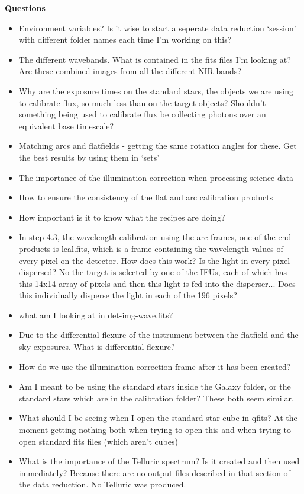 \documentclass{literature}
\begin{document}
\textbf{Questions}
\begin{itemize}
\item Environment variables? Is it wise to start a seperate data reduction `session' with different folder names each time I'm working on this? 
\item The different wavebands. What is contained in the fits files I'm looking at? Are these combined images from all the different NIR bands? 
\item Why are the exposure times on the standard stars, the objects we are using to calibrate flux, so much less than on the target objects? Shouldn't something being used to calibrate flux be collecting photons over an equivalent base timescale? 
\item Matching arcs and flatfields - getting the same rotation angles for these. Get the best results by using them in `sets' 
\item The importance of the illumination correction when processing science data
\item How to ensure the consistency of the flat and arc calibration products 
\item How important is it to know what the recipes are doing?
\item In step 4.3, the wavelength calibration using the arc frames, one of the end products is lcal.fits, which is a frame containing the wavelength values of every pixel on the detector. How does this work? Is the light in every pixel dispersed? No the target is selected by one of the IFUs, each of which has this 14x14 array of pixels and then this light is fed into the disperser... Does this individually disperse the light in each of the 196 pixels? 
\item what am I looking at in det-img-wave.fits? 
\item Due to the differential flexure of the instrument between the flatfield and the sky exposures. What is differential flexure? 
\item How do we use the illumination correction frame after it has been created? 	
\item Am I meant to be using the standard stars inside the Galaxy folder, or the standard stars which are in the calibration folder? These both seem similar. 
\item What should I be seeing when I open the standard star cube in qfits? At the moment getting nothing both when trying to open this and when trying to open standard fits files (which aren't cubes)
\item What is the importance of the Telluric spectrum? Is it created and then used immediately? Because there are no output files described in that section of the data reduction. No Telluric was produced.

\end{itemize}
\end{document}
